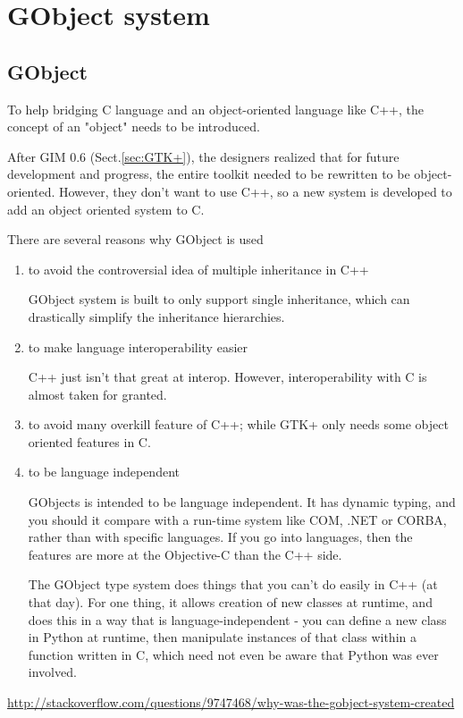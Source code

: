 \chapter{GObject system}
\label{chap:GObject}

\section{GObject}
\label{sec:GObject}

To help bridging C language and an object-oriented language like C++, the
concept of an "object" needs to be introduced. 

After GIM 0.6 (Sect.\ref{sec:GTK+}), the designers realized that for future
development and progress, the entire toolkit needed to be rewritten to be
object-oriented. However, they don't want to use C++, so a new system is
developed to add an object oriented system to C.

There are several reasons why GObject is used
\begin{enumerate}
  \item to avoid the controversial idea of multiple inheritance in C++
  
 GObject system is built to only support single inheritance, which can
 drastically simplify the inheritance hierarchies.
  
  \item to make language interoperability easier
  
C++ just isn't that great at interop. However, interoperability with C is almost
taken for granted.

  \item to avoid many overkill feature of C++; while GTK+ only needs
  some object oriented features in C.
  
  \item to be language independent
  
GObjects is intended to be language independent. It has dynamic typing, and you
should it compare with a run-time system like COM, .NET or CORBA, rather than
with specific languages. If you go into languages, then the features are more at
the Objective-C than the C++ side.

The GObject type system does things that you can't do easily in C++ (at that
day). For one thing, it allows creation of new classes at runtime, and does this
in a way that is language-independent - you can define a new class in Python at
runtime, then manipulate instances of that class within a function written in C,
which need not even be aware that Python was ever involved.
\end{enumerate}
\url{http://stackoverflow.com/questions/9747468/why-was-the-gobject-system-created}




